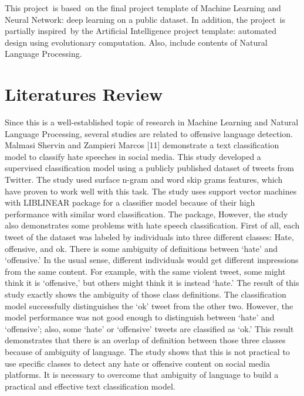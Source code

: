 \documentclass[12pt, natbib=false]{article}
\begin{document}
This project is based on the final project template of Machine Learning and Neural Network: deep learning on a public dataset. In addition, the project is partially inspired by the Artificial Intelligence project template: automated design using evolutionary computation. Also, include contents of Natural Language Processing. 


\section{Literatures Review}
Since this is a well-established topic of research in Machine Learning and Natural Language Processing, several studies are related to offensive language detection. 
Malmasi Shervin and Zampieri Marcos [11] demonstrate a text classification model to classify hate speeches in social media. This study developed a supervised classification model using a publicly published dataset of tweets from Twitter. The study used surface n-gram and word skip grams features, which have proven to work well with this task. The study uses support vector machines with LIBLINEAR package for a classifier model because of their high performance with similar word classification. The package, However, the study also demonstrates some problems with hate speech classification. First of all, each tweet of the dataset was labeled by individuals into three different classes: Hate, offensive, and ok. There is some ambiguity of definitions between ‘hate’ and ‘offensive.’ In the usual sense, different individuals would get different impressions from the same content. For example, with the same violent tweet, some might think it is ‘offensive,’ but others might think it is instead ‘hate.’ The result of this study exactly shows the ambiguity of those class definitions. The classification model successfully distinguishes the ‘ok’ tweet from the other two. However, the model performance was not good enough to distinguish between ‘hate’ and ‘offensive’; also, some ‘hate’ or ‘offensive’ tweets are classified as ‘ok.’ This result demonstrates that there is an overlap of definition between those three classes because of ambiguity of language. The study shows that this is not practical to use specific classes to detect any hate or offensive content on social media platforms. It is necessary to overcome that ambiguity of language to build a practical and effective text classification model. \\
\end{document}
